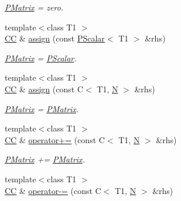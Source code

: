 \begin{DoxyCompactItemize}
\begin{DoxyCompactList}\small\item\em \mbox{\hyperlink{classENSEM_1_1PMatrix}{P\+Matrix}} = zero. \end{DoxyCompactList}\item 
{\footnotesize template$<$class T1 $>$ }\\\mbox{\hyperlink{classENSEM_1_1PMatrix_a744bac549029029effe32dc1705660ec}{CC}} \& \mbox{\hyperlink{classENSEM_1_1PMatrix_aa9ba4e8c3935c0591c0b63daef8edaa5}{assign}} (const \mbox{\hyperlink{classENSEM_1_1PScalar}{P\+Scalar}}$<$ T1 $>$ \&rhs)
\begin{DoxyCompactList}\small\item\em \mbox{\hyperlink{classENSEM_1_1PMatrix}{P\+Matrix}} = \mbox{\hyperlink{classENSEM_1_1PScalar}{P\+Scalar}}. \end{DoxyCompactList}\item 
{\footnotesize template$<$class T1 $>$ }\\\mbox{\hyperlink{classENSEM_1_1PMatrix_a744bac549029029effe32dc1705660ec}{CC}} \& \mbox{\hyperlink{classENSEM_1_1PMatrix_ac3c0e489c8c8011edc4ea93477176b84}{assign}} (const C$<$ T1, \mbox{\hyperlink{adat__devel_2lib_2hadron_2operator__name__util_8cc_a7722c8ecbb62d99aee7ce68b1752f337}{N}} $>$ \&rhs)
\begin{DoxyCompactList}\small\item\em \mbox{\hyperlink{classENSEM_1_1PMatrix}{P\+Matrix}} = \mbox{\hyperlink{classENSEM_1_1PMatrix}{P\+Matrix}}. \end{DoxyCompactList}\item 
{\footnotesize template$<$class T1 $>$ }\\\mbox{\hyperlink{classENSEM_1_1PMatrix_a744bac549029029effe32dc1705660ec}{CC}} \& \mbox{\hyperlink{classENSEM_1_1PMatrix_af6bd651888f2621169845b757b2200ee}{operator+=}} (const C$<$ T1, \mbox{\hyperlink{adat__devel_2lib_2hadron_2operator__name__util_8cc_a7722c8ecbb62d99aee7ce68b1752f337}{N}} $>$ \&rhs)
\begin{DoxyCompactList}\small\item\em \mbox{\hyperlink{classENSEM_1_1PMatrix}{P\+Matrix}} += \mbox{\hyperlink{classENSEM_1_1PMatrix}{P\+Matrix}}. \end{DoxyCompactList}\item 
{\footnotesize template$<$class T1 $>$ }\\\mbox{\hyperlink{classENSEM_1_1PMatrix_a744bac549029029effe32dc1705660ec}{CC}} \& \mbox{\hyperlink{classENSEM_1_1PMatrix_a76fa178c64fa75b73925016654a08766}{operator-\/=}} (const C$<$ T1, \mbox{\hyperlink{adat__devel_2lib_2hadron_2operator__name__util_8cc_a7722c8ecbb62d99aee7ce68b1752f337}{N}} $>$ \&rhs)

\end{DoxyCompactItemize}
